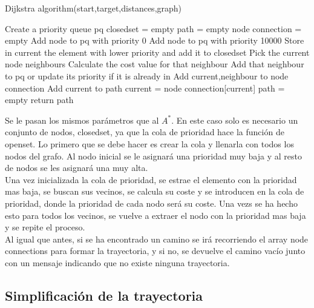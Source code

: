 \begin{algorithm}
\caption{Dijkstra algorithm(start,target,distances,graph)}\label{dikjstra}
\begin{algorithmic}
\State Create a priority queue pq
\State closedset = empty
\State path = empty
\State node connection = empty
 \State Add node to pq with priority 0
 \Else
 \State Add node to pq with priority 10000
\EndFor
{}
\State Store in current the element with lower priority and add it to closedset
 \State Pick the current node neighbours
 \State Calculate the cost value for that neighbour
 \State Add that neighbour to pq or update its priority if it is already in
 \State Add current,neighbour to node connection
\EndFor
\EndWhile
{}
\State Add current to path
\State current = node connection[current]
\EndWhile
\Else
\State path = empty
\EndIf
\State return path
\end{algorithmic}
\end{algorithm}

Se le pasan los mismos parámetros que al $A^*$. En este caso solo es necesario un conjunto de nodos, closedset, ya que la cola de prioridad hace la función de openset. Lo primero que se debe hacer es crear la cola y llenarla con todos los nodos del grafo. Al nodo inicial se le asignará una prioridad muy baja y al resto de nodos se les asignará una muy alta.\\

Una vez inicializada la cola de prioridad, se estrae el elemento con la prioridad mas baja, se buscan sus vecinos, se calcula su coste y se introducen en la cola de prioridad, donde la prioridad de cada nodo será su coste. Una vezs se ha hecho esto para todos los vecinos, se vuelve a extraer el nodo con la prioridad mas baja y se repite el proceso.\\

Al igual que antes, si se ha encontrado un camino se irá recorriendo el array node connections para formar la trayectoria, y si no, se devuelve el camino vacío junto con un mensaje indicando que no existe ninguna trayectoria.

\subsection{Simplificación de la trayectoria}

